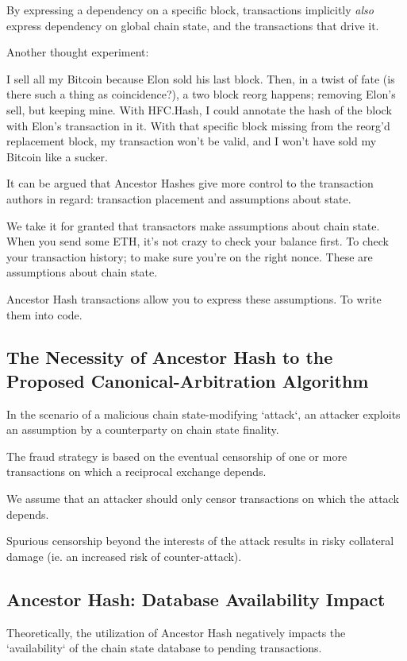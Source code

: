 \documentclass[11pt]{article}
\theoremstyle{plain}
\begin{document}
{By expressing a dependency on a specific block, transactions implicitly
\textit{also} express dependency on global chain state, and the transactions
that drive it.

Another thought experiment:

I sell all my Bitcoin because Elon sold his last block. Then, in a twist of
fate (is there such a thing as coincidence?), a two block reorg happens;
removing Elon's sell, but keeping mine.
With HFC.Hash, I could annotate the hash of the block with Elon's transaction
in it. With that specific block missing from the reorg'd replacement block, my
transaction won't be valid, and I won't have sold my Bitcoin like a sucker.

It can be argued that Ancestor Hashes give more control to the transaction
authors in regard: transaction placement and assumptions about state.

We take it for granted that transactors make assumptions about chain state.
When you send some ETH, it's not crazy to check your balance first. To check
your transaction history; to make sure you're on the right nonce.
These are assumptions about chain state. 

Ancestor Hash transactions allow you to express these assumptions. To write
them into code.

\subsection{\small{The Necessity of Ancestor Hash to the Proposed
Canonical-Arbitration Algorithm}}

In the scenario of a malicious chain state-modifying `attack`, an attacker
exploits an assumption by a counterparty on chain state finality.

The fraud strategy is based on the eventual censorship of one or more
transactions on which a reciprocal exchange depends.

We assume that an attacker should only censor transactions on which the attack
depends.

Spurious censorship beyond the interests of the attack results in risky
collateral damage (ie. an increased risk of counter-attack).


\subsection{\small{Ancestor Hash: Database Availability Impact}}

Theoretically, the utilization of Ancestor Hash negatively impacts the
`availability` of the chain state database to pending transactions.

}
\end{document}
